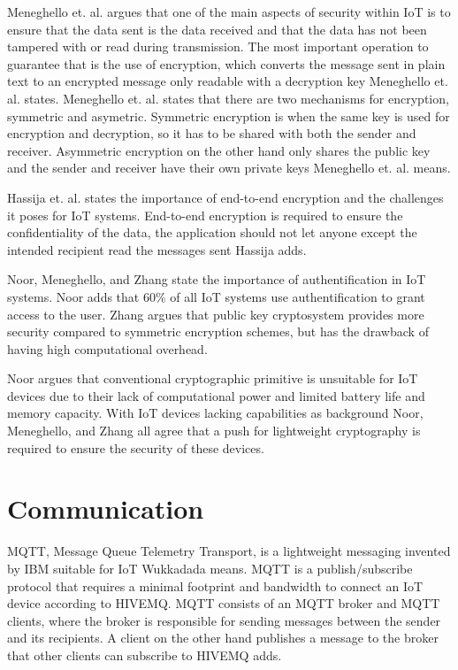 Meneghello et. al. argues that one of the main aspects of security within IoT is to ensure that the data sent is the data received and that the data has not been tampered with or read during transmission.
The most important operation to guarantee that is the use of encryption, which converts the message sent in plain text to an encrypted message only readable with a decryption key Meneghello et. al. states.
Meneghello et. al. states that there are two mechanisms for encryption, symmetric and asymetric.
Symmetric encryption is when the same key is used for encryption and decryption, so it has to be shared with both the sender and receiver.
Asymmetric encryption on the other hand only shares the public key and the sender and receiver have their own private keys Meneghello et. al. means.\cite{Meneghello2019}

Hassija et. al. states the importance of end-to-end encryption and the challenges it poses for IoT systems.
End-to-end encryption is required to ensure the confidentiality of the data, the application should not let anyone except the intended recipient read the messages sent Hassija adds.\cite{Hassija2019}

Noor, Meneghello, and Zhang state the importance of authentification in IoT systems.\cite{Noor2019,Meneghello2019,Zhang2014} 
Noor adds that 60\% of all IoT systems use authentification to grant access to the user.\cite{Noor2019}  
Zhang argues that public key cryptosystem provides more security compared to symmetric encryption schemes, but has the drawback of having high computational overhead.\cite{Zhang2014} 

Noor argues that conventional cryptographic primitive is unsuitable for IoT devices due to their lack of computational power and limited battery life and memory capacity.\cite{Noor2019}
With IoT devices lacking capabilities as background Noor, Meneghello, and Zhang all agree that a push for lightweight cryptography is required to ensure the security of these devices.\cite {Noor2019,Meneghello2019,Zhang2014} 

\section{Communication} 
MQTT, Message Queue Telemetry Transport, is a lightweight messaging invented by IBM suitable for IoT Wukkadada means.\cite{Wukkadada2018} 
MQTT is a publish/subscribe protocol that requires a minimal footprint and bandwidth to connect an IoT device according to HIVEMQ.\cite{MQTT2021}
MQTT consists of an MQTT broker and MQTT clients, where the broker is responsible for sending messages between the sender and its recipients.\cite{Wukkadada2018}
A client on the other hand publishes a message to the broker that other clients can subscribe to HIVEMQ adds.\cite{MQTT2021}

